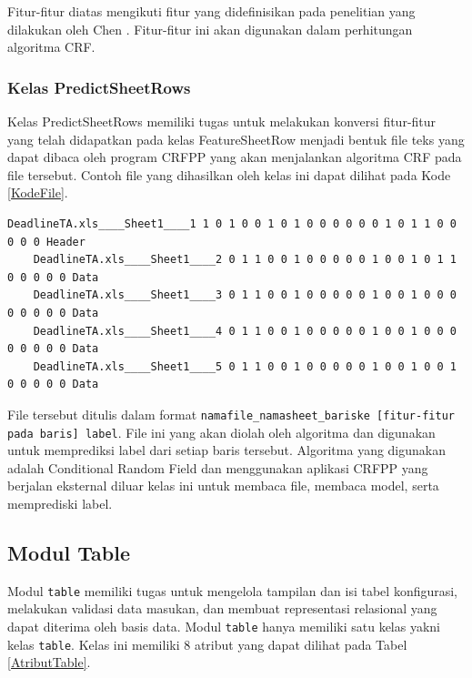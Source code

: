 	Fitur-fitur diatas mengikuti fitur yang didefinisikan pada penelitian yang dilakukan oleh Chen \citep{Chen2013}. Fitur-fitur ini akan digunakan dalam perhitungan algoritma CRF.

	\subsubsection{Kelas PredictSheetRows}
	Kelas PredictSheetRows memiliki tugas untuk melakukan konversi fitur-fitur yang telah didapatkan pada kelas FeatureSheetRow menjadi bentuk file teks yang dapat dibaca oleh program CRFPP yang akan menjalankan algoritma CRF pada file tersebut. Contoh file yang dihasilkan oleh kelas ini dapat dilihat pada Kode \ref{KodeFile}.\\

	\begin{lstlisting}[frame=single, basicstyle=\linespread{1}\scriptsize\listingsfont, captionpos=b, caption={File Berisikan Fitur Tiap Baris}, label=KodeFile]
	DeadlineTA.xls____Sheet1____1 1 0 1 0 0 1 0 1 0 0 0 0 0 0 1 0 1 1 0 0 0 0 0 Header
	DeadlineTA.xls____Sheet1____2 0 1 1 0 0 1 0 0 0 0 0 1 0 0 1 0 1 1 0 0 0 0 0 Data
	DeadlineTA.xls____Sheet1____3 0 1 1 0 0 1 0 0 0 0 0 1 0 0 1 0 0 0 0 0 0 0 0 Data
	DeadlineTA.xls____Sheet1____4 0 1 1 0 0 1 0 0 0 0 0 1 0 0 1 0 0 0 0 0 0 0 0 Data
	DeadlineTA.xls____Sheet1____5 0 1 1 0 0 1 0 0 0 0 0 1 0 0 1 0 0 1 0 0 0 0 0 Data
	\end{lstlisting}

	File tersebut ditulis dalam format \texttt{namafile\_namasheet\_bariske [fitur-fitur pada baris] label}. File ini yang akan diolah oleh algoritma dan digunakan untuk memprediksi label dari setiap baris tersebut. Algoritma yang digunakan adalah Conditional Random Field dan menggunakan aplikasi CRFPP yang berjalan eksternal diluar kelas ini untuk membaca file, membaca model, serta memprediski label.

	\subsection{Modul Table}
	Modul \texttt{table} memiliki tugas untuk mengelola tampilan dan isi tabel konfigurasi, melakukan validasi data masukan, dan membuat representasi relasional yang dapat diterima oleh basis data. Modul \texttt{table} hanya memiliki satu kelas yakni kelas \texttt{table}. Kelas ini memiliki 8 atribut yang dapat dilihat pada Tabel \ref{AtributTable}.

